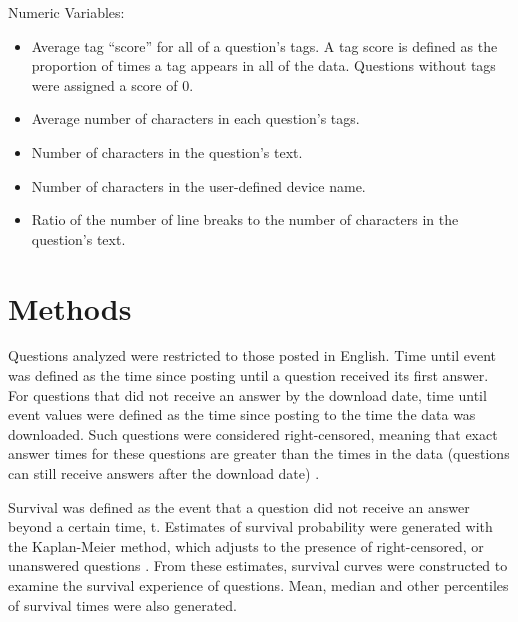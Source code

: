 \documentclass{article}
\begin{document}
Numeric Variables:

\begin{itemize}
  \item Average tag ``score'' for all of a question's tags. A tag score is defined as the proportion of times a tag appears in all of the data. Questions without tags were assigned a score of 0. 
  \item Average number of characters in each question's tags. 
  \item Number of characters in the question's text. 
  \item Number of characters in the user-defined device name. 
  \item Ratio of the number of line breaks to the number of characters in the question's text.
\end{itemize}


\section*{Methods}

Questions analyzed were restricted to those posted in English. Time until event was defined as the time since posting until a question received its first answer. For questions that did not receive an answer by the download date, time until event values were defined as the time since posting to the time the data was downloaded. Such questions were considered right-censored, meaning that exact answer times for these questions are greater than the times in the data (questions can still receive answers after the download date) \citep{Kleinbaum2011}. 

Survival was defined as the event that a question did not receive an answer beyond a certain time, t. Estimates of survival probability were generated with the Kaplan-Meier method, which adjusts to the presence of right-censored, or unanswered questions \citep{Bland1998}. From these estimates, survival curves were constructed to examine the survival experience of questions. Mean, median and other percentiles of survival times were also generated. 
\end{document}
